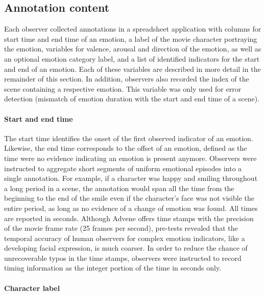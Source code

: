 \subsection*{Annotation content}

Each observer collected annotations in a spreadsheet application with columns
for start time and end time of an emotion, a label of the movie character
portraying the emotion, variables for valence, arousal and direction of the
emotion, as well as an optional emotion category label, and a list of
identified indicators for the start and end of an emotion. Each of these
variables are described in more detail in the remainder of this section. In
addition, observers also recorded the index of the scene containing a
respective emotion. This variable was only used for error detection (mismatch
of emotion duration with the start and end time of a scene).

\paragraph{Start and end time}

The start time identifies the onset of the first observed indicator of an
emotion. Likewise, the end time corresponds to the offset of an emotion,
defined as the time were no evidence indicating an emotion is present anymore.
Observers were instructed to aggregate short segments of uniform emotional
episodes into a single annotation. For example, if a character was happy and
smiling throughout a long period in a scene, the annotation would span all the
time from the beginning to the end of the smile even if the character's face was
not visible the entire period, as long as no evidence of a change of emotion
was found.  All times are reported in seconds. Although Advene offers time
stamps with the precision of the movie frame rate (25 frames per second),
pre-tests revealed that the temporal accuracy of human observers for complex
emotion indicators, like a developing facial expression, is much coarser. In
order to reduce the chance of unrecoverable typos in the time stamps, observers
were instructed to record timing information as the integer portion of the time
in seconds only.

\paragraph{Character label}

